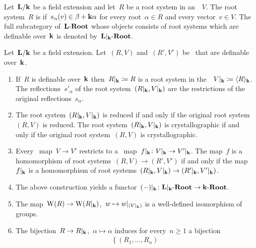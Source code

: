\begin{definition}
  Let~$\mathbf{L}/\mathbf{k}$ be a field extension and let~$R$ be a root system in an~{\vectorspace{$\Lf$}}~$V$.
  The root system~$R$ is  if~$s_\alpha(v) \in \beta + \mathbf{k} \alpha$ for every root~$\alpha \in R$ and every vector~$v \in V$.
  The full subcategory of~$\mathbf{L}\text{-}\mathbf{Root}$ whose objects consists of root systems which are definable over~$\kf$ is denoted by~$\cRoot{\restrict{\Lf}{\kf}}$.
\end{definition}


\begin{proposition}
  Let~$\mathbf{L}/\mathbf{k}$ be a field extension.
  Let~$(R, V)$ and~$(R', V')$ be~{\rootsystems{$\Lf$}} that are definable over~$\kf$.
  \begin{enumerate}
    \item
      If~$R$ is definable over~$\kf$ then~$\restrict{R}{\kf} \defined R$ is a root system in the~{\vectorspace{$\kf$}}~$\restrict{V}{\kf} \defined \gen{R}_\kf$.
      The reflections~$s'_\alpha$ of the root system~$(\restrict{R}{\kf}, \restrict{V}{\kf})$ are the restrictions of the original reflections~$s_\alpha$.
    \item
      The root system~$(\restrict{R}{\kf}, \restrict{V}{\kf})$ is reduced if and only if the original root system~$(R, V)$ is reduced.
      The root system~$(\restrict{R}{\kf}, \restrict{V}{\kf})$ is crystallographic if and only if the original root system~$(R, V)$ is crystallographic.
    \item
      Every~{\linear{$\Lf$}} map~$V \to V'$ restricts to a~{\linear{$\kf$}} map~$\restrict{f}{\kf} \colon \restrict{V}{\kf} \to \restrict{V'}{\kf}$.
      The map~$f$ is a homomorphism of root systems~$(R, V) \to (R', V')$ if and only if the map~$\restrict{f}{\kf}$ is a homomorphism of root systems~$(\restrict{R}{\kf}, \restrict{V}{\kf}) \to (\restrict{R'}{\kf}, \restrict{V'}{\kf})$.
    \item
      The above construction yields a functor~$\restrict{(-)}{\kf} \colon \cRoot{\restrict{\Lf}{\kf}} \to \cRoot{\kf}$.
    \item
      The map~$\Weyl(R) \to \Weyl(\restrict{R}{\kf})$,~$w \mapsto \restrict{w}{(\restrict{V}{\kf})}$ is a well-defined isomorphism of groups.
    \item
      The bijection~$R \to \restrict{R}{\kf}$,~$\alpha \mapsto \alpha$ induces for every~$n \geq 1$ a bijection
      \begin{align*}
        \left\{
          (R_1, \dotsc, R_n)

\end{align*}
\end{enumerate}
\end{proposition}
